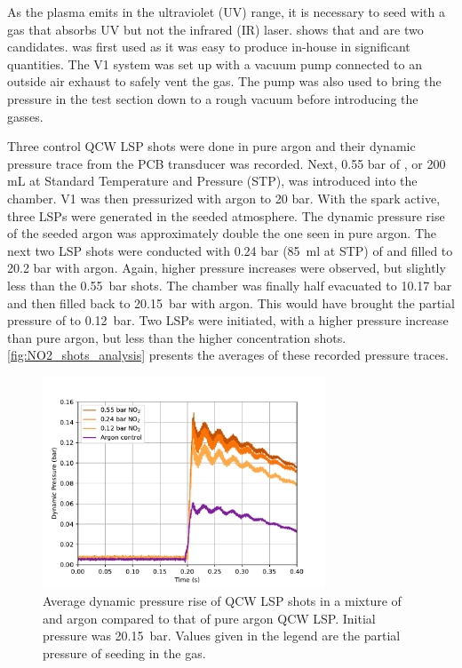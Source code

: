             As the plasma emits in the ultraviolet (UV) range, it is necessary to seed with a gas that absorbs UV but not the infrared (IR) laser. \textcite{khanGasDetectionUsing2019} shows that  and  are two candidates.  was first used as it was easy to produce in-house in significant quantities. The V1 system was set up with a vacuum pump connected to an outside air exhaust to safely vent the  gas. The pump was also used to bring the pressure in the test section down to a rough vacuum before introducing the gasses.


            Three control QCW LSP shots were done in pure argon and their dynamic pressure trace from the PCB transducer was recorded. Next, 0.55 bar of , or 200 mL at Standard Temperature and Pressure (STP), was introduced into the chamber. V1 was then pressurized with argon to 20 bar. With the spark active, three LSPs were generated in the seeded atmosphere. The dynamic pressure rise of the seeded argon was approximately double the one seen in pure argon. The next two LSP shots were conducted with 0.24 bar (\qty{85}{ml} at STP) of  and filled to 20.2 bar with argon. Again, higher pressure increases were observed, but slightly less than the \qty{0.55}{bar} shots. The chamber was finally half evacuated to 10.17 bar and then filled back to \qty{20.15}{bar} with argon. This would have brought the partial pressure of  to \qty{0.12}{bar}. Two LSPs were initiated, with a higher pressure increase than pure argon, but less than the higher concentration  shots. \autoref{fig:NO2_shots_analysis} presents the averages of these recorded pressure traces.

            \begin{figure}[!ht]
                \centering
                \includegraphics[width=0.75\textwidth]{assets/4 experiments/NO2_shots_analysis.pdf}
                \caption{Average dynamic pressure rise of QCW LSP shots in a mixture of  and argon compared to that of pure argon QCW LSP. Initial pressure was \qty{20.15}{bar}. Values given in the legend are the partial pressure of  seeding in the gas.}
                \label{fig:NO2_shots_analysis}
            \end{figure}

